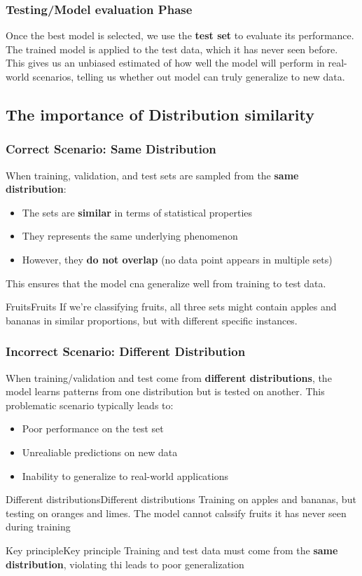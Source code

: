 \documentclass[a4paper]{article}
\theoremstyle{definition}
\begin{document}
\subsubsection{Testing/Model evaluation Phase}
Once the best model is selected, we use the \textbf{test set} to evaluate its performance. The trained model is applied 
to the test data, which it has never seen before. This gives us an unbiased estimated of how well the model will perform in real-world scenarios,
telling us whether out model can truly generalize to new data.
\subsection{The importance of Distribution similarity}
\subsubsection{Correct Scenario: Same Distribution}
When training, validation, and test sets are sampled from the \textbf{same distribution}:
\begin{itemize}
    \item The sets are \textbf{similar} in terms of statistical properties 
    \item They represents the same underlying phenomenon 
    \item However, they \textbf{do not overlap} (no data point appears in multiple sets)
\end{itemize}
This ensures that the model cna generalize well from training to test data.
\begin{example}{Fruits}{Fruits}
If we're classifying fruits, all three sets might contain apples and bananas in similar proportions, but with different specific instances.
\end{example}
\subsubsection{Incorrect Scenario: Different Distribution}
When training/validation and test come from \textbf{different distributions}, the model learns patterns from one distribution but is tested on another.
This problematic scenario typically leads to:
\begin{itemize}
    \item Poor performance on the test set 
    \item Unrealiable predictions on new data 
    \item Inability to generalize to real-world applications
\end{itemize}
\begin{example}{Different distributions}{Different distributions}
Training on apples and bananas, but testing on oranges and limes. The model cannot calssify fruits it has never seen during training
\end{example}
\begin{theorem}{Key principle}{Key principle}
Training and test data must come from the \textbf{same distribution}, violating thi leads to poor generalization
\end{theorem}
    
\end{document}
